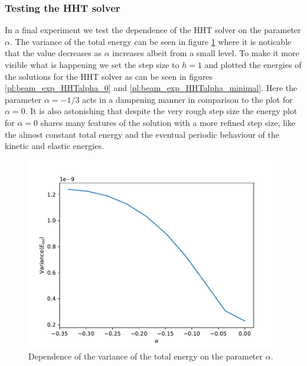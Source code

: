 \documentclass{report}
\newcounter{constant}
\begin{document}
\subsubsection*{Testing the HHT solver}

In a final experiment we test the dependence of the HHT solver on the parameter $\alpha$. The variance of the total energy can be seen in figure \ref{pl:beam_exp_HHTalpha} where it is noticable that the value decreases as $\alpha$ increases albeit from a small level. To make it more visible what is happening we set the step size to $h=1$ and plotted the energies of the solutions for the HHT solver as can be seen in figures \ref{pl:beam_exp_HHTalpha_0} and \ref{pl:beam_exp_HHTalpha_minimal}. Here the parameter $\alpha=-1/3$ acts in a dampening manner in comparison to the plot for $\alpha=0$. It is also astonishing that despite the very rough step size the energy plot for $\alpha=0$ shares many features of the solution with a more refined step size, like the almost constant total energy and the eventual periodic behaviour of the kinetic and elastic energies.

\begin{figure}[h]
\centering
\begin{minipage}[t]{0.45\textwidth}
\centering
\includegraphics[width=\textwidth]{../Plots/Project3_main/Figure_920.pdf}
\caption{Dependence of the variance of the total energy on the parameter $\alpha$.}
\label{pl:beam_exp_HHTalpha}
\end{minipage}
\end{figure}
\end{document}
